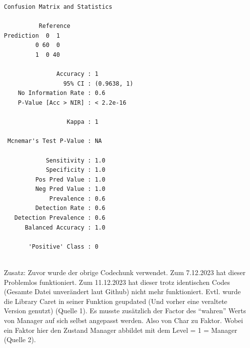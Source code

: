 \documentclass[
  letterpaper,
  DIV=11,
  numbers=noendperiod]{scrartcl}
\newenvironment{Shaded}{\begin{snugshade}}{\end{snugshade}}
\newcommand{\CommentTok}[1]{\textcolor[rgb]{0.37,0.37,0.37}{#1}}
\begin{document}
\begin{verbatim}
Confusion Matrix and Statistics

          Reference
Prediction  0  1
         0 60  0
         1  0 40
                                     
               Accuracy : 1          
                 95% CI : (0.9638, 1)
    No Information Rate : 0.6        
    P-Value [Acc > NIR] : < 2.2e-16  
                                     
                  Kappa : 1          
                                     
 Mcnemar's Test P-Value : NA         
                                     
            Sensitivity : 1.0        
            Specificity : 1.0        
         Pos Pred Value : 1.0        
         Neg Pred Value : 1.0        
             Prevalence : 0.6        
         Detection Rate : 0.6        
   Detection Prevalence : 0.6        
      Balanced Accuracy : 1.0        
                                     
       'Positive' Class : 0          
                                     
\end{verbatim}

\begin{Shaded}
\end{Shaded}

Zusatz: Zuvor wurde der obrige Codechunk verwendet. Zum 7.12.2023 hat
dieser Problemlos funktioniert. Zum 11.12.2023 hat dieser trotz
identischen Codes (Gesamte Datei unverändert laut Github) nicht mehr
funktioniert. Evtl. wurde die Library Caret in seiner Funktion geupdated
(Und vorher eine veraltete Version genutzt) (Quelle 1). Es musste
zusätzlich der Factor des ``wahren'' Werts von Manager auf sich selbst
angepasst werden. Also von Char zu Faktor. Wobei ein Faktor hier den
Zustand Manager abbildet mit dem Level = 1 = Manager (Quelle 2).
\end{document}
